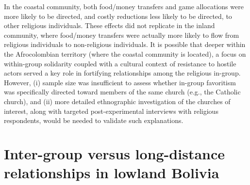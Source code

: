 \documentclass[bibauthoryear]{aa}
\begin{document}
In the coastal community, both food/money transfers and game allocations were more likely to be directed, and costly reductions less likely to be directed, to other religious individuals. These effects did not replicate in the inland community, where food/money transfers were actually more likely to flow from religious individuals to non-religious individuals. It is possible that deeper within the Afrocolombian territory (where the coastal community is located), a focus on within-group solidarity coupled with a cultural context of resistance to hostile actors \citep{oyola2017local} %
 served a key role in fortifying relationships among the religious in-group. However, (i) sample size was insufficient to assess whether in-group favoritism was specifically directed toward members of the same church (e.g., the Catholic church), and (ii) more detailed ethnographic investigation of the churches of interest, along with targeted post-experimental interviews with religious respondents, would be needed to validate such explanations.



\section{Inter-group versus long-distance relationships in lowland Bolivia}
\end{document}
